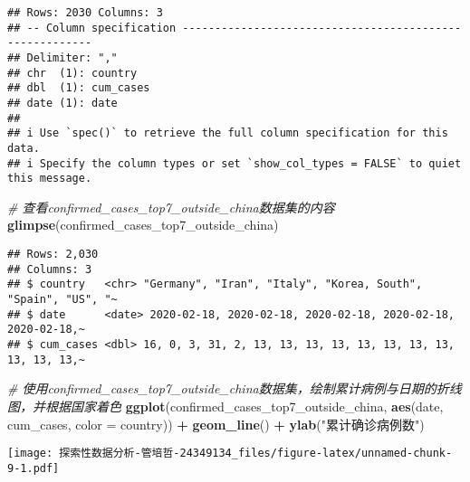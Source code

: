 \documentclass[
]{article}
\newenvironment{Shaded}{\begin{snugshade}}{\end{snugshade}}
\newcommand{\AttributeTok}[1]{\textcolor[rgb]{0.13,0.29,0.53}{#1}}
\newcommand{\CommentTok}[1]{\textcolor[rgb]{0.56,0.35,0.01}{\textit{#1}}}
\newcommand{\FunctionTok}[1]{\textcolor[rgb]{0.13,0.29,0.53}{\textbf{#1}}}
\newcommand{\NormalTok}[1]{#1}
\newcommand{\SpecialCharTok}[1]{\textcolor[rgb]{0.81,0.36,0.00}{\textbf{#1}}}
\newcommand{\StringTok}[1]{\textcolor[rgb]{0.31,0.60,0.02}{#1}}
\begin{document}
\begin{verbatim}
## Rows: 2030 Columns: 3
## -- Column specification --------------------------------------------------------
## Delimiter: ","
## chr  (1): country
## dbl  (1): cum_cases
## date (1): date
## 
## i Use `spec()` to retrieve the full column specification for this data.
## i Specify the column types or set `show_col_types = FALSE` to quiet this message.
\end{verbatim}

\begin{Shaded}
\begin{Highlighting}[]
\CommentTok{\# 查看confirmed\_cases\_top7\_outside\_china数据集的内容}
\FunctionTok{glimpse}\NormalTok{(confirmed\_cases\_top7\_outside\_china)}
\end{Highlighting}
\end{Shaded}

\begin{verbatim}
## Rows: 2,030
## Columns: 3
## $ country   <chr> "Germany", "Iran", "Italy", "Korea, South", "Spain", "US", "~
## $ date      <date> 2020-02-18, 2020-02-18, 2020-02-18, 2020-02-18, 2020-02-18,~
## $ cum_cases <dbl> 16, 0, 3, 31, 2, 13, 13, 13, 13, 13, 13, 13, 13, 13, 13, 13,~
\end{verbatim}

\begin{Shaded}
\begin{Highlighting}[]
\CommentTok{\# 使用confirmed\_cases\_top7\_outside\_china数据集，绘制累计病例与日期的折线图，并根据国家着色}
\FunctionTok{ggplot}\NormalTok{(confirmed\_cases\_top7\_outside\_china, }\FunctionTok{aes}\NormalTok{(date, cum\_cases, }\AttributeTok{color =}\NormalTok{ country)) }\SpecialCharTok{+}
  \FunctionTok{geom\_line}\NormalTok{() }\SpecialCharTok{+}
  \FunctionTok{ylab}\NormalTok{(}\StringTok{"累计确诊病例数"}\NormalTok{)}
\end{Highlighting}
\end{Shaded}

\texttt{[image: 探索性数据分析-管培哲-24349134\_files/figure-latex/unnamed-chunk-9-1.pdf]}
\end{document}
